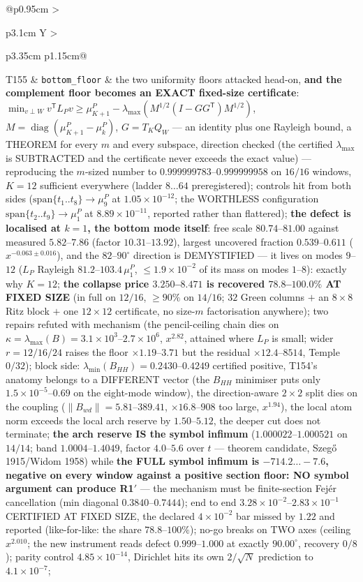 \documentclass[11pt,a4paper]{article}
\begin{document}
{\begin{xltabular}{\linewidth}{@{}p{0.95cm} >{\raggedright\arraybackslash}p{3.1cm} Y >{\raggedright\scriptsize\arraybackslash}p{3.35cm} p{1.15cm}@{}}
T155 & \texttt{\scriptsize bottom\_\allowbreak floor} & the two uniformity floors attacked head-on, \textbf{and the complement floor becomes an EXACT fixed-size certificate}: $\min_{v\perp W}v^{\mathsf T}L_Pv\ge\mu^P_{K+1}-\lambda_{\max}(M^{1/2}(I-GG^{\mathsf T})M^{1/2})$, $M=\operatorname{diag}(\mu^P_{K+1}-\mu^P_k)$, $G=T_KQ_W$ --- an identity plus one Rayleigh bound, a THEOREM for every $m$ and every subspace, direction checked (the certified $\lambda_{\max}$ is SUBTRACTED and the certificate never exceeds the exact value) --- reproducing the $m$-sized number to $0.999999783$--$0.999999958$ on $16/16$ windows, $K=12$ sufficient everywhere (ladder $8\ldots64$ preregistered); controls hit from both sides ($\mathrm{span}\{t_1..t_8\}\to\mu^P_9$ at $1.05\times10^{-12}$; the WORTHLESS configuration $\mathrm{span}\{t_2..t_9\}\to\mu^P_1$ at $8.89\times10^{-11}$, reported rather than flattered); \textbf{the defect is localised at $k=1$, the bottom mode itself}: free scale $80.74$--$81.00$ against measured $5.82$--$7.86$ (factor $10.31$--$13.92$), largest uncovered fraction $0.539$--$0.611$ ($x^{-0.063\pm0.016}$), and the $82$--$90^\circ$ direction is DEMYSTIFIED --- it lives on modes $9$--$12$ ($L_P$ Rayleigh $81.2$--$103.4\,\mu^P_1$, $\le1.9\times10^{-2}$ of its mass on modes $1$--$8$): exactly why $K=12$; \textbf{the collapse price $3.250$--$8.471$ is recovered $78.8$--$100.0\%$ AT FIXED SIZE} (in full on $12/16$, $\ge90\%$ on $14/16$; $32$ Green columns $+$ an $8\times8$ Ritz block $+$ one $12\times12$ certificate, no size-$m$ factorisation anywhere); two repairs refuted with mechanism (the pencil-ceiling chain dies on $\kappa=\lambda_{\max}(B)=3.1\times10^{3}$--$2.7\times10^{6}$, $x^{2.82}$, attained where $L_P$ is small; wider $r=12/16/24$ raises the floor $\times1.19$--$3.71$ but the residual $\times12.4$--$8514$, Temple $0/32$); block side: $\lambda_{\min}(B_{HH})=0.2430$--$0.4249$ certified positive, T154's anatomy belongs to a DIFFERENT vector (the $B_{HH}$ minimiser puts only $1.5\times10^{-5}$--$0.69$ on the eight-mode window), the direction-aware $2\times2$ split dies on the coupling ($\|B_{wd}\|=5.81$--$389.41$, $\times16.8$--$908$ too large, $x^{1.94}$), the local atom norm exceeds the local arch reserve by $1.50$--$5.12$, the deeper cut does not terminate; \textbf{the arch reserve IS the symbol infimum} ($1.000022$--$1.000521$ on $14/14$; band $1.0004$--$1.4049$, factor $4.0$--$5.6$ over $t$ --- theorem candidate, Szeg\H{o} 1915/Widom 1958) while \textbf{the FULL symbol infimum is $-714.2\ldots-7.6$, negative on every window against a positive section floor: NO symbol argument can produce R1$'$} --- the mechanism must be finite-section Fej\'er cancellation (min diagonal $0.3840$--$0.7444$); end to end $3.28\times10^{-2}$--$2.83\times10^{-1}$ CERTIFIED AT FIXED SIZE, the declared $4\times10^{-2}$ bar missed by $1.22$ and reported (like-for-like: the share $78.8$--$100\%$); no-go breaks on TWO axes (ceiling $x^{2.010}$; the new instrument reads defect $0.999$--$1.000$ at exactly $90.00^\circ$, recovery $0/8$); parity control $4.85\times10^{-14}$, Dirichlet hits its own $2/\sqrt N$ prediction to $4.1\times10^{-7}$; 
\end{xltabular}}
\end{document}
